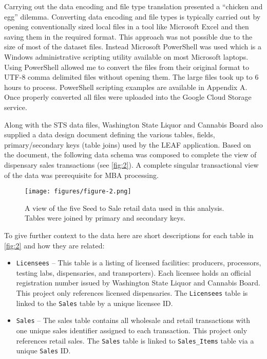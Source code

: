 \documentclass[../article.tex, 12pt]{subfiles}
\begin{document}
\begin{multicols*}{2}
\par
Carrying out the data encoding and file type translation presented a ``chicken and egg'' dilemma. Converting data encoding and file types is typically carried out by opening conventionally sized local files in a tool like Microsoft Excel and then saving them in the required format. This approach was not possible due to the size of most of the dataset files. Instead Microsoft PowerShell was used which is a Windows administrative scripting utility available on most Microsoft laptops. Using PowerShell allowed me to convert the files from their original format to UTF-8 comma delimited files without opening them. The large files took up to 6 hours to process. PowerShell scripting examples are available in Appendix A. Once properly converted all files were uploaded into the Google Cloud Storage service.

\par
Along with the STS data files, Washington State Liquor and Cannabis Board also supplied a data design document defining the various tables, fields, primary/secondary keys (table joins) used by the LEAF application. Based on the document, the following data schema was composed to complete the view of dispensary sales transactions (see \autoref{fig:2}). A complete singular transactional view of the data was prerequisite for MBA processing.

\begin{figure*}
\texttt{[image: figures/figure-2.png]}
\captionsetup{margin=.1\linewidth}
\caption{A view of the five Seed to Sale retail data used in this analysis. Tables were joined by primary and secondary keys.}
\label{fig:2}
\end{figure*}

To give further context to the data here are short descriptions for each table in \autoref{fig:2} and how they are related:
\begin{itemize}
\item \texttt{Licensees} – This table is a listing of licensed facilities: producers, processors, testing labs, dispensaries, and transporters). Each licensee holds an official registration number issued by Washington State Liquor and Cannabis Board. This project only references licensed dispensaries. The \texttt{Licensees} table is linked to the \texttt{Sales} table by a unique licensee ID.

\item \texttt{Sales} – The sales table contains all wholesale and retail transactions with one unique sales identifier assigned to each transaction. This project only references retail sales. The \texttt{Sales} table is linked to \texttt{Sales\_Items} table via a unique \texttt{Sales} ID.


\end{itemize}
\end{multicols*}
\end{document}
